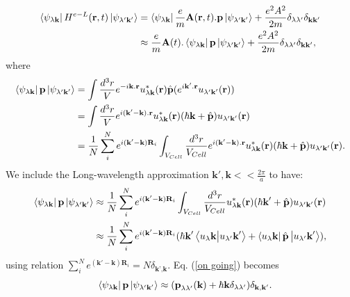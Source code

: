 \documentclass[12pt,english,a4paper]{article}
\begin{document}
	\begin{align}
		\bra{\psi_{\lambda\textbf{k}}}H^{e-L}(\textbf{r},t)\ket{\psi_{\lambda'\textbf{k}'}} &= \bra{\psi_{\lambda\textbf{k}}}\frac{e}{m}\textbf{A}(\textbf{r},t).\textbf{p}\ket{\psi_{\lambda'\textbf{k}'}} +\frac{e^2 A^2}{2m} \delta_{\lambda \lambda'}\delta_{\textbf{k}\textbf{k}'} \nonumber\\
		&\approx \frac{e}{m}\textbf{A}(t). \bra{\psi_{\lambda\textbf{k}}}\textbf{p}\ket{\psi_{\lambda'\textbf{k}'}} + \frac{e^2 A^2}{2m} \delta_{\lambda \lambda'}\delta_{\textbf{k}\textbf{k}'},
	\end{align}
	\quad where
	\begin{align}
		\bra{\psi_{\lambda\textbf{k}}}\textbf{p}\ket{\psi_{\lambda'\textbf{k}'}} &= \int \frac{d^3 r}{V} e^{-i\textbf{k}.\textbf{r}}u^{*}_{\lambda \textbf{k}}(\textbf{r}) \hat{\textbf{p}}(e^{i\textbf{k}'.\textbf{r}} u_{\lambda'\textbf{k}'}(\textbf{r})) \nonumber \\
		& =	\int \frac{d^3 r}{V} e^{i(\textbf{k}'-\textbf{k}).\textbf{r}}u^{*}_{\lambda \textbf{k}}(\textbf{r}) (\hbar \textbf{k}+\hat{\textbf{p}}) u_{\lambda'\textbf{k}'}(\textbf{r}) \nonumber \\
		\label{p before wave approximate}
		& = \frac{1}{N} \sum_{i}^{N} e^{i(\textbf{k}'-\textbf{k})\textbf{R}_i} \int_{V_{Cell}} \frac{d^3r}{V_{Cell}}e^{i(\textbf{k}'-\textbf{k}).\textbf{r}}u^{*}_{\lambda \textbf{k}}(\textbf{r}) (\hbar \textbf{k}+\hat{\textbf{p}}) u_{\lambda'\textbf{k}'}(\textbf{r}).
	\end{align}
\quad We include the Long-wavelength approximation $\textbf{k}',\textbf{k} << \frac{2\pi}{a}$ to have:
	\begin{align}
		\bra{\psi_{\lambda\textbf{k}}}\textbf{p}\ket{\psi_{\lambda'\textbf{k}'}} &\approx \frac{1}{N} \sum_{i}^{N} e^{i(\textbf{k}'-\textbf{k})\textbf{R}_i} \int_{V_{Cell}} \frac{d^3r}{V_{Cell}}u^{*}_{\lambda \textbf{k}}(\textbf{r}) (\hbar \textbf{k}'+\hat{\textbf{p}}) u_{\lambda'\textbf{k}'}(\textbf{r})\nonumber \\
		& \approx \frac{1}{N} \sum_{i}^{N} e^{i(\textbf{k}'-\textbf{k})\textbf{R}_i} (\hbar \textbf{k}' \bra{u_\lambda \textbf{k}} \ket{u_{\lambda'}\textbf{k}'} + \bra{u_\lambda \textbf{k}} \hat{\textbf{p}}\ket{u_{\lambda'}\textbf{k}'}),
		\label{on going}
	\end{align}
	\quad using relation $
\sum_{i}^{N} e^{(\textbf{k}'-\textbf{k})\textbf{R}_i}= N\delta_{\textbf{k'},\textbf{k}}$. Eq. (\ref{on going}) becomes
	\begin{equation}
		\label{p after LWA}
		\quad \bra{\psi_{\lambda\textbf{k}}}\textbf{p}\ket{\psi_{\lambda'\textbf{k}'}} \approx (\textbf{p}_{\lambda\lambda'}(\textbf{k}) + \hbar \textbf{k} \delta_{\lambda\lambda'}) \delta_{\textbf{k}, \textbf{k}'}.
	\end{equation}
\end{document}
